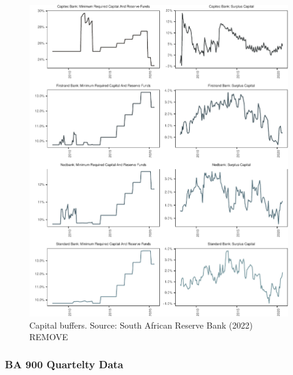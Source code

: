 \documentclass[
]{article}
\begin{document}
\begin{figure}[H]

\includegraphics{Bank_capital_and_bank_lending_files/figure-latex/capbuf-1} \hfill{}

\caption{Capital buffers. Source: South African Reserve Bank (2022) REMOVE}\label{fig:capbuf}
\end{figure}

\hypertarget{ba-900-quartelty-data}{%
\subsubsection{BA 900 Quartelty Data}\label{ba-900-quartelty-data}}
\end{document}
